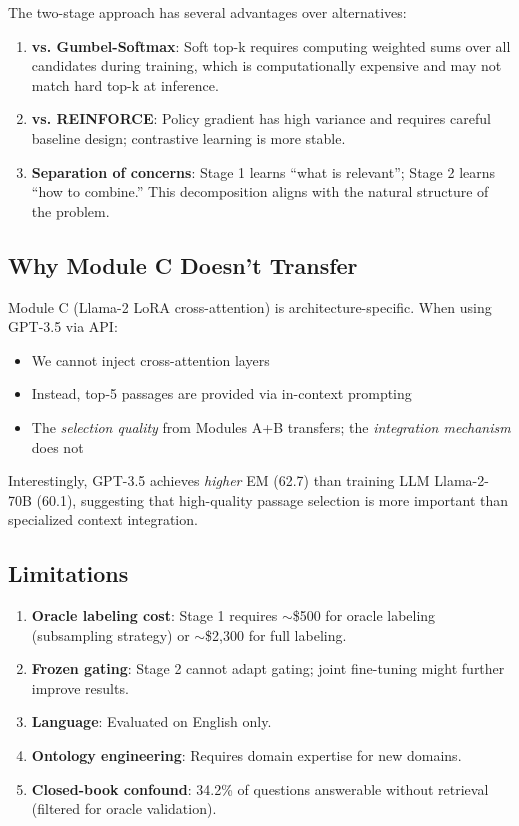 \documentclass[10pt,twocolumn]{article}
\begin{document}
The two-stage approach has several advantages over alternatives:

\begin{enumerate}
    \item \textbf{vs. Gumbel-Softmax}: Soft top-k requires computing weighted sums over all candidates during training, which is computationally expensive and may not match hard top-k at inference.
    \item \textbf{vs. REINFORCE}: Policy gradient has high variance and requires careful baseline design; contrastive learning is more stable.
    \item \textbf{Separation of concerns}: Stage 1 learns ``what is relevant''; Stage 2 learns ``how to combine.'' This decomposition aligns with the natural structure of the problem.
\end{enumerate}

\subsection{Why Module C Doesn't Transfer}

Module C (Llama-2 LoRA cross-attention) is architecture-specific. When using GPT-3.5 via API:
\begin{itemize}
    \item We cannot inject cross-attention layers
    \item Instead, top-5 passages are provided via in-context prompting
    \item The \textit{selection quality} from Modules A+B transfers; the \textit{integration mechanism} does not
\end{itemize}

Interestingly, GPT-3.5 achieves \textit{higher} EM (62.7) than training LLM Llama-2-70B (60.1), suggesting that high-quality passage selection is more important than specialized context integration.

\subsection{Limitations}

\begin{enumerate}
    \item \textbf{Oracle labeling cost}: Stage 1 requires $\sim$\$500 for oracle labeling (subsampling strategy) or $\sim$\$2,300 for full labeling.
    \item \textbf{Frozen gating}: Stage 2 cannot adapt gating; joint fine-tuning might further improve results.
    \item \textbf{Language}: Evaluated on English only.
    \item \textbf{Ontology engineering}: Requires domain expertise for new domains.
    \item \textbf{Closed-book confound}: 34.2\% of questions answerable without retrieval (filtered for oracle validation).
\end{enumerate}
\end{document}
